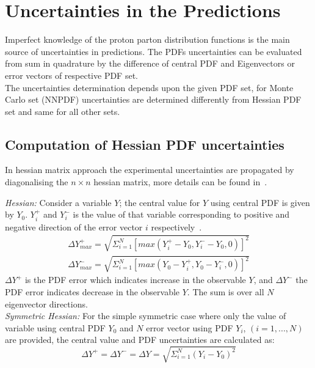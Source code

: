 \section{Uncertainties in the Predictions}
Imperfect knowledge of the proton parton distribution functions is the main source of uncertainties in predictions. The PDFs uncertainties can be evaluated from sum in quadrature by the difference of central PDF and Eigenvectors or error vectors of respective PDF set.\\
The uncertainties determination depends upon the given PDF set, for Monte Carlo set (NNPDF) uncertainties are determined differently from Hessian PDF  set and same for all other sets. 
\subsection{Computation of Hessian PDF uncertainties}
In hessian matrix approach the experimental uncertainties are propagated by diagonalising the $n\times n$ hessian matrix, more details can be found in~\cite{alekhin2011pdf4lhc}.

\textit{Hessian:} Consider a variable $Y$; the central value for $Y$ using central PDF is given by $Y_{0}$. $Y_{i}^{+}$ and $Y_{i}^{-}$ is the value of that variable corresponding to positive and negative direction of the error vector $i$ respectively~\cite{alekhin2011pdf4lhc}.  
\begin{eqnarray}
\Delta Y_{max}^{+}=\sqrt{\Sigma_{i=1}^{N}[max(Y_{i}^{+}-Y_{0},Y_{i}^{-}-Y_{0},0)]^{2}}\\
\Delta Y_{max}^{-}=\sqrt{\Sigma_{i=1}^{N}[max(Y_{0}-Y_{i}^{+},Y_{0}-Y_{i}^{-},0)]^{2}}
\end{eqnarray}
$\Delta Y^{+}$ is the PDF error which indicates increase in the observable $Y$, and $\Delta Y^{-}$ the PDF error indicates decrease in the observable $Y$. The sum is over all $N$ eigenvector directions.\\
\textit{Symmetric Hessian:} For the simple symmetric case where only the value of variable using central PDF $Y_{0}$ and $N$ error vector using PDF  $Y_{i}$, $(i = 1, . . . , N)$ are provided, the central value and PDF uncertainties are calculated as:
\begin{equation}
\Delta Y^{+}=\Delta Y^{-}=\Delta Y=\sqrt{\Sigma_{i=1}^{N}(Y_{i}-Y_{0})^{2}}
\end{equation}
